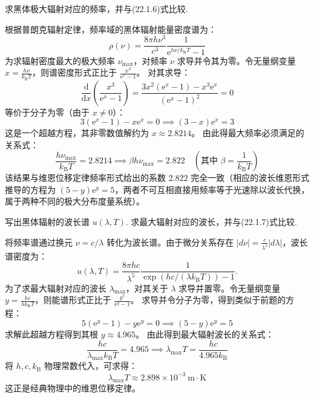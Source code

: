 \begin{exercise}\label{ex:27.9}
求黑体极大辐射对应的频率，并与(22.1.6)式比较.
\end{exercise}
\begin{solution}
根据普朗克辐射定律，频率域的黑体辐射能量密度谱为：
$$ \rho(\nu) = \frac{8\pi h \nu^3}{c^3} \frac{1}{\mathrm{e}^{h\nu / k_{\mathrm{B}} T} - 1} $$
为求辐射密度最大的极大频率 $\nu_{\max}$，对频率 $\nu$ 求导并令其为零。令无量纲变量 $x = \frac{h\nu}{k_{\mathrm{B}} T}$，则谱密度形式正比于 $\frac{x^3}{\mathrm{e}^x - 1}$。
对其求导：
$$ \frac{\mathrm{d}}{\mathrm{d}x} \left( \frac{x^3}{\mathrm{e}^x - 1} \right) = \frac{3x^2 (\mathrm{e}^x - 1) - x^3 \mathrm{e}^x}{(\mathrm{e}^x - 1)^2} = 0 $$
等价于分子为零（由于 $x \neq 0$）：
$$ 3 (\mathrm{e}^x - 1) - x \mathrm{e}^x = 0 \implies (3 - x)\mathrm{e}^x = 3 $$
这是一个超越方程，其非零数值解约为 $x \approx 2.8214$。
由此得最大频率必须满足的关系式：
$$ \frac{h\nu_{\max}}{k_{\mathrm{B}} T} = 2.8214 \implies \beta h\nu_{\max} = 2.822 \quad \left( \text{其中 } \beta = \frac{1}{k_{\mathrm{B}} T} \right) $$
该结果与维恩位移定律频率形式给出的系数 $2.822$ 完全一致（相应的波长维恩形式推导的方程为 $(5-y)\mathrm{e}^y = 5$，两者不可互相直接用频率等于光速除以波长代换，属于两种不同的极大分布度量系统）。
\end{solution}

\begin{exercise}\label{ex:27.10}
写出黑体辐射的波长谱 $u(\lambda, T)$. 求最大辐射对应的波长，并与(22.1.7)式比较.
\end{exercise}
\begin{solution}
将频率谱通过换元 $\nu = c/\lambda$ 转化为波长谱。由于微分关系存在 $|d\nu| = \frac{c}{\lambda^2} |d\lambda|$，波长谱密度为：
\[
u(\lambda,T)=\frac{8\pi hc}{\lambda^5}
\frac{1}{\exp\!\left(hc/(\lambda k_{\mathrm B}T)\right)-1}.
\]
为了求最大辐射对应的波长 $\lambda_{\max}$，对其关于 $\lambda$ 求导并置零。令无量纲变量 $y = \frac{hc}{\lambda k_{\mathrm{B}} T}$，则能谱形式正比于 $\frac{y^5}{\mathrm{e}^y - 1}$。
求导并令分子为零，得到类似于前题的方程：
$$ 5 (\mathrm{e}^y - 1) - y \mathrm{e}^y = 0 \implies (5 - y)\mathrm{e}^y = 5 $$
求解此超越方程得到其根 $y \approx 4.965$。
由此得到最大辐射波长的关系式：
$$ \frac{hc}{\lambda_{\max} k_{\mathrm{B}} T} = 4.965 \implies \lambda_{\max} T = \frac{hc}{4.965 k_{\mathrm{B}}} $$
将 $h, c, k_{\mathrm{B}}$ 物理常数代入，可求得：
$$ \lambda_{\max} T \approx 2.898 \times 10^{-3} \ \mathrm{m \cdot K} $$
这正是经典物理中的维恩位移定律。
\end{solution}

